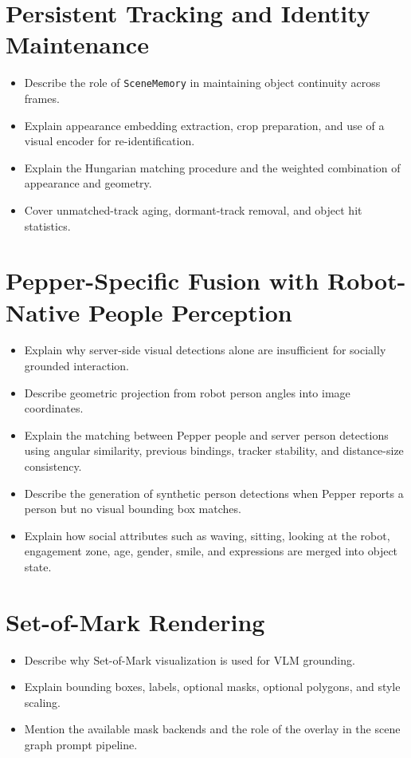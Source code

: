 \documentclass[
  digital,     %
  oneside,     %
  nosansbold,  %
  nocolorbold, %
  lof,         %
  lot,         %
]{fithesis4}
\begin{document}
\section{Persistent Tracking and Identity Maintenance}
\begin{itemize}
    \item Describe the role of \texttt{SceneMemory} in maintaining object continuity across frames.
    \item Explain appearance embedding extraction, crop preparation, and use of a visual encoder for re-identification.
    \item Explain the Hungarian matching procedure and the weighted combination of appearance and geometry.
    \item Cover unmatched-track aging, dormant-track removal, and object hit statistics.
\end{itemize}

\section{Pepper-Specific Fusion with Robot-Native People Perception}
\begin{itemize}
    \item Explain why server-side visual detections alone are insufficient for socially grounded interaction.
    \item Describe geometric projection from robot person angles into image coordinates.
    \item Explain the matching between Pepper people and server person detections using angular similarity, previous bindings, tracker stability, and distance-size consistency.
    \item Describe the generation of synthetic person detections when Pepper reports a person but no visual bounding box matches.
    \item Explain how social attributes such as waving, sitting, looking at the robot, engagement zone, age, gender, smile, and expressions are merged into object state.
\end{itemize}

\section{Set-of-Mark Rendering}
\begin{itemize}
    \item Describe why Set-of-Mark visualization is used for VLM grounding.
    \item Explain bounding boxes, labels, optional masks, optional polygons, and style scaling.
    \item Mention the available mask backends and the role of the overlay in the scene graph prompt pipeline.
\end{itemize}
\end{document}
